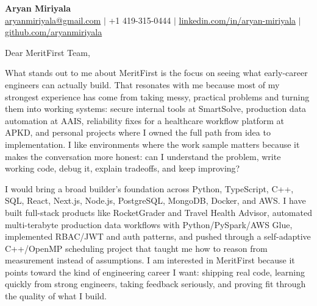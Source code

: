 \documentclass[11pt]{letter}
\begin{document}
\begin{center}
{\Large \textbf{Aryan Miriyala}}\\
\href{mailto:aryanmiriyala@gmail.com}{aryanmiriyala@gmail.com} $|$ +1 419-315-0444 $|$
\href{https://www.linkedin.com/in/aryan-miriyala-7788a21b6/}{linkedin.com/in/aryan-miriyala} $|$
\href{https://github.com/aryanmiriyala}{github.com/aryanmiriyala}
\end{center}

\vspace{0.15in}

Dear MeritFirst Team,

What stands out to me about MeritFirst is the focus on seeing what early-career engineers can actually build. That resonates with me because most of my strongest experience has come from taking messy, practical problems and turning them into working systems: secure internal tools at SmartSolve, production data automation at AAIS, reliability fixes for a healthcare workflow platform at APKD, and personal projects where I owned the full path from idea to implementation. I like environments where the work sample matters because it makes the conversation more honest: can I understand the problem, write working code, debug it, explain tradeoffs, and keep improving?

I would bring a broad builder's foundation across Python, TypeScript, C++, SQL, React, Next.js, Node.js, PostgreSQL, MongoDB, Docker, and AWS. I have built full-stack products like RocketGrader and Travel Health Advisor, automated multi-terabyte production data workflows with Python/PySpark/AWS Glue, implemented RBAC/JWT and auth patterns, and pushed through a self-adaptive C++/OpenMP scheduling project that taught me how to reason from measurement instead of assumptions. I am interested in MeritFirst because it points toward the kind of engineering career I want: shipping real code, learning quickly from strong engineers, taking feedback seriously, and proving fit through the quality of what I build.
\end{document}
